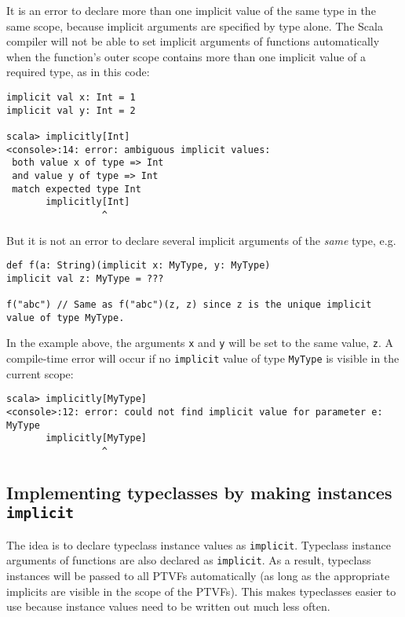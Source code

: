 It is an error to declare more than one implicit value of the same
type in the same scope, because implicit arguments are specified by
type alone. The Scala compiler will not be able to set implicit arguments
of functions automatically when the function\textsf{'}s outer scope contains
more than one implicit value of a required type, as in this code:
\begin{lstlisting}
implicit val x: Int = 1
implicit val y: Int = 2

scala> implicitly[Int]
<console>:14: error: ambiguous implicit values:
 both value x of type => Int
 and value y of type => Int
 match expected type Int
       implicitly[Int]
                 ^
\end{lstlisting}
But it is not an error to declare several implicit arguments of the
\emph{same} type, e.g.
\begin{lstlisting}
def f(a: String)(implicit x: MyType, y: MyType)
implicit val z: MyType = ???

f("abc") // Same as f("abc")(z, z) since z is the unique implicit value of type MyType.
\end{lstlisting}
In the example above, the arguments \lstinline!x! and \lstinline!y!
will be set to the same value, \lstinline!z!. A compile-time error
will occur if no \lstinline!implicit! value of type \lstinline!MyType!
is visible in the current scope:
\begin{lstlisting}
scala> implicitly[MyType]
<console>:12: error: could not find implicit value for parameter e: MyType
       implicitly[MyType]
                 ^
\end{lstlisting}


\subsection{Implementing typeclasses by making instances \texttt{implicit} }

The idea is to declare typeclass instance values as \lstinline!implicit!.
Typeclass instance arguments of functions are also declared as \lstinline!implicit!.
As a result, typeclass instances will be passed to all PTVFs automatically
(as long as the appropriate implicits are visible in the scope of
the PTVFs). This makes typeclasses easier to use because instance
values need to be written out much less often.

